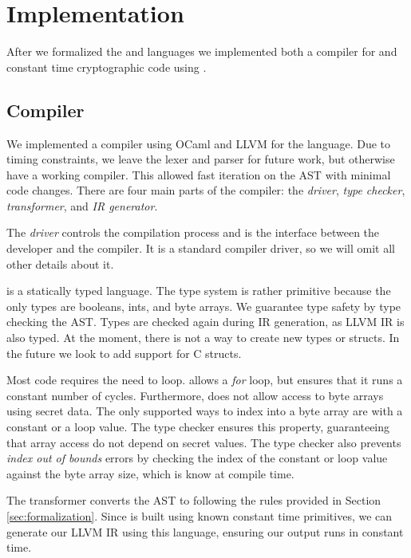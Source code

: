 \section{Implementation}
\label{sec:implementation}

After we formalized the \constc and \ccore languages we implemented both a compiler for \constc and constant time cryptographic code using \constc.

\subsection{\constc Compiler}
We implemented a compiler using OCaml and LLVM for the \constc language. Due to timing constraints, we leave the lexer and parser for future work, but otherwise have a working compiler. This allowed fast iteration on the AST with minimal code changes. There are four main parts of the \constc compiler: the \textit{driver}, \textit{type checker}, \textit{transformer}, and \textit{IR generator}.

 The \textit{driver} controls the compilation process and is the interface between the developer and the compiler. It is a standard compiler driver, so we will omit all other details about it.

 \constc is a statically typed language. The type system is rather primitive because the only types are booleans, ints, and byte arrays. We guarantee type safety by type checking the \constc AST. Types are checked again during IR generation, as LLVM IR is also typed. At the moment, there is not a way to create new types or structs. In the future we look to add support for C structs.

Most code requires the need to loop. \constc allows a \textit{for} loop, but ensures that it runs a constant number of cycles. Furthermore, \constc does not allow access to byte arrays using secret data. The only supported ways to index into a byte array are with a constant or a loop value. The type checker ensures this property, guaranteeing that array access do not depend on secret values. The type checker also prevents \textit{index out of bounds} errors by checking the index of the constant or loop value against the byte array size, which is know at compile time.

 The transformer converts the \constc AST to \ccore following the rules provided in Section \ref{sec:formalization}. Since \ccore is built using known constant time primitives, we can generate our LLVM IR using this language, ensuring our output runs in constant time.

